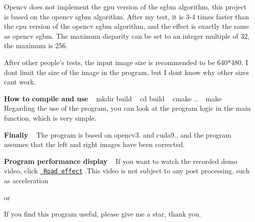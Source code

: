 Opencv does not implement the gpu version of the sgbm algorithm, this project is based on the opencv sgbm algorithm. After my test, it is 3-\/4 times faster than the cpu version of the opencv sgbm algorithm, and the effect is exactly the same as opencv sgbm. The maximum disparity can be set to an integer multiple of 32, the maximum is 256. ~\newline


After other people’s tests, the input image size is recommended to be 640$\ast$480. I don\textquotesingle{}t limit the size of the image in the program, but I don\textquotesingle{}t know why other sizes can\textquotesingle{}t work.

{\bfseries{How to compile and use}} ~\newline
 mkdir build ~\newline
 cd build ~\newline
 cmake .. ~\newline
 make ~\newline
 Regarding the use of the program, you can look at the program logic in the main function, which is very simple. ~\newline


{\bfseries{Finally}} ~\newline
 The program is based on opencv3. and cuda9., and the program assumes that the left and right images have been corrected. ~\newline


{\bfseries{Program performance display}} ~\newline
 If you want to watch the recorded demo video, click \href{https://v.youku.com/v_show/id_XMzk0NjE1MDEwNA==.html?spm=a2hzp.8253869.0.0}{\texttt{ Road effect}} .This video is not subject to any post processing, such as acceleration ~\newline


or ~\newline
  ~\newline
  ~\newline


If you find this program useful, please give me a star, thank you. ~\newline
 